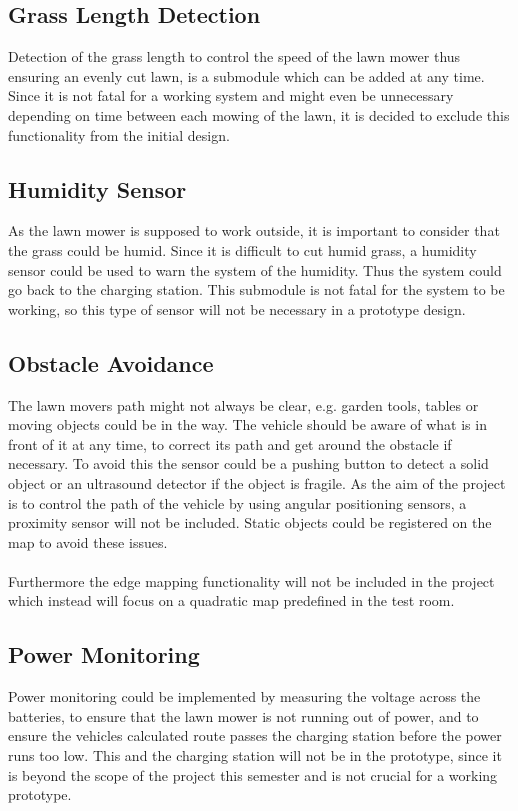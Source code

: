 
\subsection{Grass Length Detection}
Detection of the grass length to control the speed of the lawn mower thus ensuring an evenly cut lawn, is a submodule which can be added at any time. Since it is not fatal for a working system and might even be unnecessary depending on time between each mowing of the lawn, it is decided to exclude this functionality from the initial design.

\subsection{Humidity Sensor}
As the lawn mower is supposed to work outside, it is important to consider that the grass could be humid. Since it is difficult to cut humid grass, a humidity sensor could be used to warn the system of the humidity. Thus the system could go back to the charging station. This submodule is not fatal for the system to be working, so this type of sensor will not be necessary in a prototype design.

\subsection{Obstacle Avoidance}
The lawn movers path might not always be clear, e.g. garden tools, tables or moving objects could be in the way. The vehicle should be aware of what is in front of it at any time, to correct its path and get around the obstacle if necessary. To avoid this the sensor could be a pushing button to detect a solid object or an ultrasound detector if the object is fragile.
As the aim of the project is to control the path of the vehicle by using angular positioning sensors, a proximity sensor will not be included. Static objects could be registered on the map to avoid these issues.\\\\
Furthermore the edge mapping functionality will not be included in the project which instead will focus on a quadratic map predefined in the test room.

\subsection{Power Monitoring}
Power monitoring could be implemented by measuring the voltage across the batteries, to ensure that the lawn mower is not running out of power, and to ensure the vehicles calculated route passes the charging station before the power runs too low.
This and the charging station will not be in the prototype, since it is beyond the scope of the project this semester and is not crucial for a working prototype.

